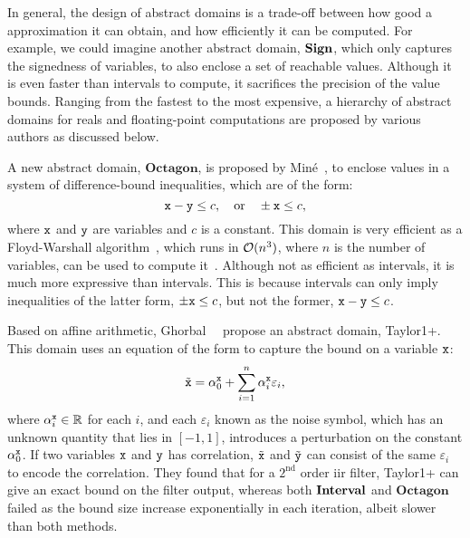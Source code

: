 In general, the design of abstract domains is a trade-off between how good
a approximation it can obtain, and how efficiently it can be computed.  For
example, we could imagine another abstract domain, $\mathbf{Sign}$, which only
captures the signedness of variables, to also enclose a set of reachable
values.  Although it is even faster than intervals to compute, it sacrifices
the precision of the value bounds.  Ranging from the fastest to the most
expensive, a hierarchy of abstract domains for reals and floating-point
computations are proposed by various authors as discussed below.

A new abstract domain, $\mathbf{Octagon}$, is proposed by Min\'e~\cite{mine07},
to enclose values in a system of difference-bound inequalities, which are of
the form:
\begin{equation}
    \texttt{x} - \texttt{y} \leq c, \quad \text{or} \quad
    \pm \texttt{x} \leq c,
\end{equation}
where $\texttt{x}$ and $\texttt{y}$ are variables and $c$ is a constant.  This domain
is very efficient as a Floyd-Warshall algorithm~\cite{floyd62}, which runs in
$\operatorname{\mathcal{O}}(n^3)$, where $n$ is the number of variables, can be used to compute
it~\cite{mine04}.  Although not as efficient as intervals, it is much
more expressive than intervals.  This is because intervals can only imply
inequalities of the latter form, $\pm \texttt{x} \leq c$, but not the former, $\texttt{x}
- \texttt{y} \leq c$.

Based on affine arithmetic, Ghorbal~\etal~\cite{ghorbal09} propose an abstract
domain, Taylor1+\@.  This domain uses an equation of the form to capture the
bound on a variable $\texttt{x}$:
\begin{equation}
    \tilde{\texttt{x}} =
        \alpha^{\texttt{x}}_0 + \sum_{i = 1}^{n} \alpha^{\texttt{x}}_i \varepsilon_i,
\end{equation}
where $\alpha^{\texttt{x}}_i \in \mathbb{R}$ for each $i$, and each $\varepsilon_i$
known as the noise symbol, which has an unknown quantity that lies in
$[-1, 1]$, introduces a perturbation on the constant $\alpha^{\texttt{x}}_0$.
If two variables $\texttt{x}$ and $\texttt{y}$ has correlation, $\tilde{\texttt{x}}$
and $\tilde{\texttt{y}}$ can consist of the same $\varepsilon_i$ to encode
the correlation.  They found that for a $2^\mathrm{nd}$ order \gls{iir}
filter, Taylor1+ can give an exact bound on the filter output, whereas both
$\mathbf{Interval}$ and $\mathbf{Octagon}$ failed as the bound size increase
exponentially in each iteration, albeit slower than both methods.

